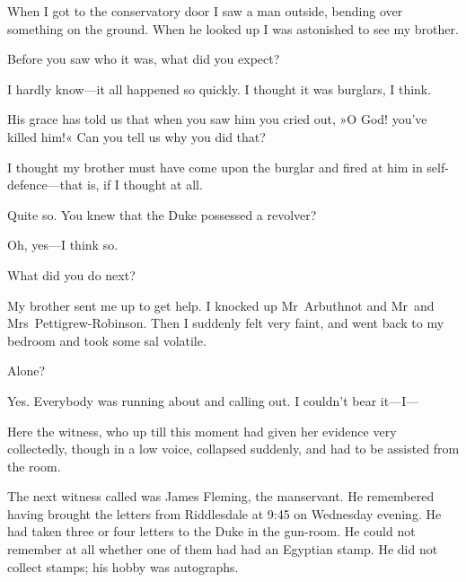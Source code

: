\begin{dialogue}
  When I got to the conservatory door I saw a man outside, bending over something on the ground. When he looked up I was astonished to see my brother.

 Before you saw who it was, what did you expect?

 I hardly know—it all happened so quickly. I thought it was burglars, I think.

 His grace has told us that when you saw him you cried out, »O God! you've killed him!« Can you tell us why you did that?

  I thought my brother must have come upon the burglar and fired at him in self-defence—that is, if I thought at all.

 Quite so. You knew that the Duke possessed a revolver?

 Oh, yes—I think so.

 What did you do next?

 My brother sent me up to get help. I knocked up Mr~Arbuthnot and Mr~and Mrs~Pettigrew-Robinson. Then I suddenly felt very faint, and went back to my bedroom and took some sal volatile.

 Alone?

 Yes. Everybody was running about and calling out. I couldn't bear it—I—
\end{dialogue}

Here the witness, who up till this moment had given her evidence very collectedly, though in a low voice, collapsed suddenly, and had to be assisted from the room.


The next witness called was James Fleming, the manservant. He remembered having brought the letters from Riddlesdale at 9:45 on Wednesday evening. He had taken three or four letters to the Duke in the gun-room. He could not remember at all whether one of them had had an Egyptian stamp. He did not collect stamps; his hobby was autographs.

